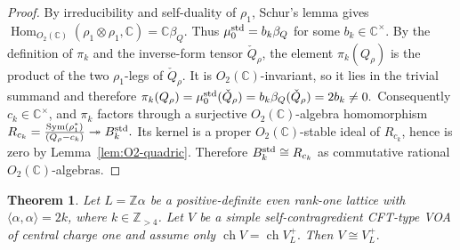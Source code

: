 \documentclass[12pt,leqno]{amsart}
\numberwithin{equation}{section} \newtheorem{thm}{Theorem}[section] \newtheorem{lem}[thm]{Lemma} \newtheorem{ex}[thm]{Example} \newtheorem{prop}[thm]{Proposition} \newtheorem{cor}[thm]{Corollary} \newtheorem{defi}[thm]{Definition} \newtheorem{rmk}[thm]{Remark} \newtheorem{notation}[thm]{Notation}
\newcommand{\Sym}{\operatorname{Sym}}
\newcommand{\Hom}{\operatorname{Hom}}
\newcommand{\ch}{\operatorname{ch}}
\newcommand{\Otwo}{O_2(\C)}
\def\Z{\mathbb{Z}} \def\N{\mathbb{N}} \def\A{\mathbb{A}} \def\C{\mathbb{C}} \def\R{\mathbb{R}} \def\Q{\mathbb{Q}} \def\F{\mathbb{F}}
\begin{document}
\begin{proof}
By irreducibility and self-duality of $\rho_1$, Schur's lemma gives \(\Hom_{\Otwo}(\rho_1\otimes\rho_1,\C)=\C\beta_Q.\) Thus \(\mu_0^{\rm std}=b_k\beta_Q\) for some $b_k\in\C^\times$. By the definition of $\pi_k$ and the inverse-form tensor $\check Q_\rho$, the element $\pi_k(Q_\rho)$ is the product of the two $\rho_1$-legs of $\check Q_\rho$. It is $\Otwo$-invariant, so it lies in the trivial summand and therefore \(\pi_k(Q_\rho) =\mu_0^{\rm std}(\check Q_\rho) =b_k\beta_Q(\check Q_\rho) =2b_k\ne0.\) Consequently $c_k\in\C^\times$, and $\pi_k$ factors through a surjective $\Otwo$-algebra homomorphism \(R_{c_k}=\frac{\Sym(\rho_1^*)}{(Q_\rho-c_k)} \twoheadrightarrow B_k^{\rm std}.\) Its kernel is a proper $\Otwo$-stable ideal of $R_{c_k}$, hence is zero by Lemma~\ref{lem:O2-quadric}. Therefore $B_k^{\rm std}\cong R_{c_k}$ as commutative rational $\Otwo$-algebras.
\end{proof}

\begin{thm}\label{thm:VLplus-kgt4}
Let $L=\Z\alpha$ be a positive-definite even rank-one lattice with $\langle\alpha,\alpha\rangle=2k$, where $k\in\Z_{>4}$. Let $V$ be a simple self-contragredient CFT-type VOA of central charge one and assume only \(\ch V=\ch V_L^+.\) Then \(V\cong V_L^+.\)
\end{thm}
\end{document}
